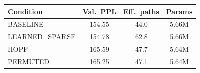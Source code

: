 \begin{tabular}{lccc}
\toprule
Condition & Val.\ PPL & Eff.\ paths & Params \\
\midrule
BASELINE & 154.55 & 44.0 & 5.66M \\
LEARNED\_SPARSE & 154.78 & 62.8 & 5.66M \\
HOPF & 165.59 & 47.7 & 5.64M \\
PERMUTED & 165.25 & 47.1 & 5.64M \\
\bottomrule
\end{tabular}
